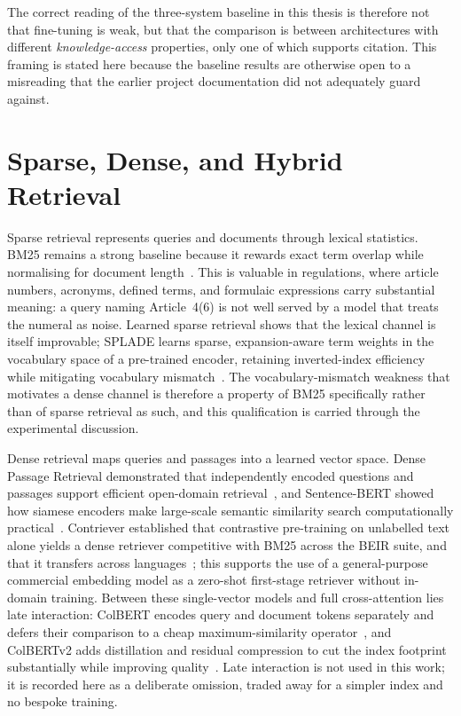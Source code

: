 The correct reading of the three-system baseline in this thesis is therefore not that fine-tuning is weak, but that the comparison is between architectures with different \emph{knowledge-access} properties, only one of which supports citation. This framing is stated here because the baseline results are otherwise open to a misreading that the earlier project documentation did not adequately guard against.

\section{Sparse, Dense, and Hybrid Retrieval}
\label{sec:sota-retrieval}

Sparse retrieval represents queries and documents through lexical statistics. BM25 remains a strong baseline because it rewards exact term overlap while normalising for document length~\cite{robertson2009bm25}. This is valuable in regulations, where article numbers, acronyms, defined terms, and formulaic expressions carry substantial meaning: a query naming Article~4(6) is not well served by a model that treats the numeral as noise. Learned sparse retrieval shows that the lexical channel is itself improvable; SPLADE learns sparse, expansion-aware term weights in the vocabulary space of a pre-trained encoder, retaining inverted-index efficiency while mitigating vocabulary mismatch~\cite{formal2021splade}. The vocabulary-mismatch weakness that motivates a dense channel is therefore a property of BM25 specifically rather than of sparse retrieval as such, and this qualification is carried through the experimental discussion.

Dense retrieval maps queries and passages into a learned vector space. Dense Passage Retrieval demonstrated that independently encoded questions and passages support efficient open-domain retrieval~\cite{karpukhin2020dpr}, and Sentence-BERT showed how siamese encoders make large-scale semantic similarity search computationally practical~\cite{reimers2019sentencebert}. Contriever established that contrastive pre-training on unlabelled text alone yields a dense retriever competitive with BM25 across the BEIR suite, and that it transfers across languages~\cite{izacard2022contriever}; this supports the use of a general-purpose commercial embedding model as a zero-shot first-stage retriever without in-domain training. Between these single-vector models and full cross-attention lies late interaction: ColBERT encodes query and document tokens separately and defers their comparison to a cheap maximum-similarity operator~\cite{khattab2020colbert}, and ColBERTv2 adds distillation and residual compression to cut the index footprint substantially while improving quality~\cite{santhanam2022colbertv2}. Late interaction is not used in this work; it is recorded here as a deliberate omission, traded away for a simpler index and no bespoke training.

